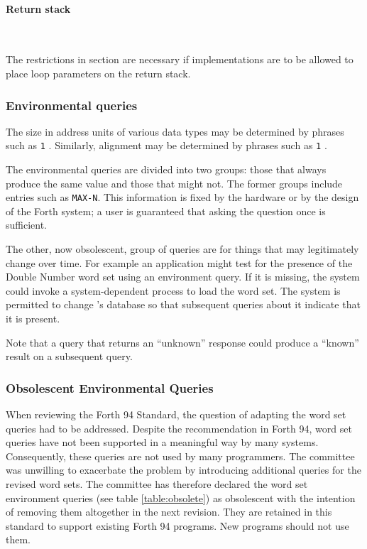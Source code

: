 \paragraph{Return stack} ~ %

The restrictions in section 
are necessary if implementations are to be allowed to place loop
parameters on the return stack.

\addtocounter{subsubsection}{2}
\subsubsection{Environmental queries} %

The size in address units of various data types may be determined by
phrases such as \texttt{1} . Similarly, alignment may be
determined by phrases such as \texttt{1} .

The environmental queries are divided into two groups: those that
always produce the same value and those that might not. The former
groups include entries such as \texttt{MAX-N}. This information is
fixed by the hardware or by the design of the Forth system; a user
is guaranteed that asking the question once is sufficient.

The other, now obsolescent, group of queries are for things that may
legitimately change over time. For example an application might test
for the presence of the Double Number word set using an environment
query.  If it is missing, the system could invoke a system-dependent
process to load the word set. The system is permitted to change
's database so that subsequent queries about
it indicate that it is present.

Note that a query that returns an ``unknown'' response could produce
a ``known'' result on a subsequent query.

\subsubsection{Obsolescent Environmental Queries} %
\label{rat:obsolete}

When reviewing the Forth 94 Standard, the question of adapting the
word set queries had to be addressed.  Despite the recommendation
in Forth 94, word set queries have not been
supported in a meaningful way by many systems.  Consequently, these
queries are not used by many programmers.  The committee was unwilling
to exacerbate the problem by introducing additional queries for the
revised word sets.  The committee has therefore declared the word set
environment queries (see table \ref{table:obsolete}) as obsolescent
with the intention of removing them altogether in the next revision.
They are retained in this standard to support existing Forth 94
programs.  New programs should not use them.

